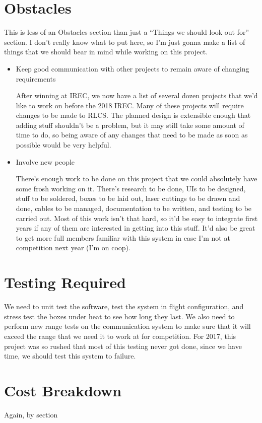 \documentclass{article}
\begin{document}
    \section{Obstacles}
        This is less of an Obstacles section than just a ``Things we should look out for'' section. I don't really know what to put here, so I'm just gonna make a list of things that we should bear in mind while working on this project.
        \begin{itemize}
        \item Keep good communication with other projects to remain aware of changing requirements

            After winning at IREC, we now have a list of several dozen projects that we'd like to work on before the 2018 IREC. Many of these projects will require changes to be made to RLCS. The planned design is extensible enough that adding stuff shouldn't be a problem, but it may still take some amount of time to do, so being aware of any changes that need to be made as soon as possible would be very helpful.
        \item Involve new people

            There's enough work to be done on this project that we could absolutely have some frosh working on it. There's research to be done, UIs to be designed, stuff to be soldered, boxes to be laid out, laser cuttings to be drawn and done, cables to be managed, documentation to be written, and testing to be carried out. Most of this work isn't that hard, so it'd be easy to integrate first years if any of them are interested in getting into this stuff. It'd also be great to get more full members familiar with this system in case I'm not at competition next year (I'm on coop).
        \end{itemize}

    \section{Testing Required}
        We need to unit test the software, test the system in flight configuration, and stress test the boxes under heat to see how long they last. We also need to perform new range tests on the communication system to make sure that it will exceed the range that we need it to work at for competition. For 2017, this project was so rushed that most of this testing never got done, since we have time, we should test this system to failure.

    \section{Cost Breakdown}
        Again, by section
\end{document}
